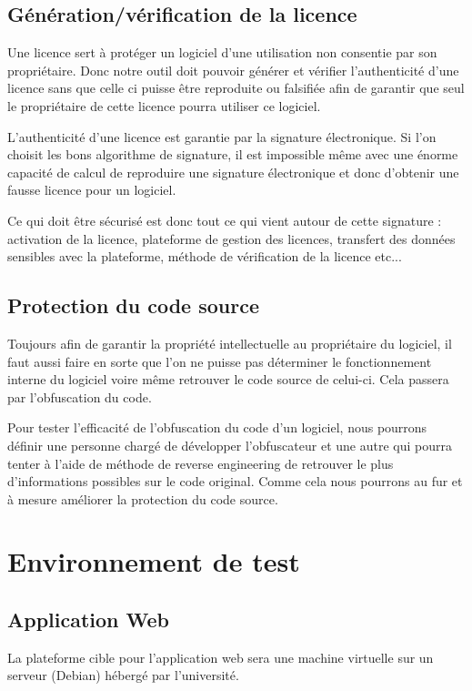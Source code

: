 \section{Génération/vérification de la licence}
Une licence sert à protéger un logiciel d'une utilisation non consentie par son propriétaire.
Donc notre outil doit pouvoir générer et vérifier l'authenticité d'une licence sans que celle
ci puisse être reproduite ou falsifiée afin de garantir que seul le propriétaire de cette licence
pourra utiliser ce logiciel.

L'authenticité d'une licence est garantie par la signature électronique. Si l'on choisit les bons
algorithme de signature, il est impossible même avec une énorme capacité de calcul de reproduire
une signature électronique et donc d'obtenir une fausse licence pour un logiciel.

Ce qui doit être sécurisé est donc tout ce qui vient autour de cette signature : activation de la
licence, plateforme de gestion des licences, transfert des données sensibles avec la plateforme,
méthode de vérification de la licence etc...

\section{Protection du code source}
Toujours afin de garantir la propriété intellectuelle au propriétaire du logiciel, il faut aussi
faire en sorte que l'on ne puisse pas déterminer le fonctionnement interne du logiciel voire même
retrouver le code source de celui-ci. Cela passera par l'obfuscation du code.

Pour tester l'efficacité de l'obfuscation du code d'un logiciel, nous pourrons définir une
personne chargé de développer l'obfuscateur et une autre qui pourra tenter à l'aide de méthode
de reverse engineering de retrouver le plus d'informations possibles sur le code original.
Comme cela nous pourrons au fur et à mesure améliorer la protection du code source.

\chapter{Environnement de test}

\section{Application Web}
La plateforme cible pour l'application web sera une machine virtuelle sur un serveur (Debian)
hébergé par l'université.

